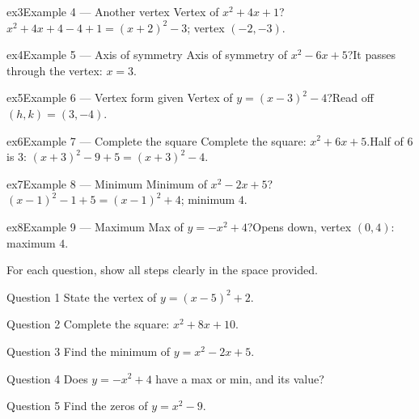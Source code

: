 \documentclass[11pt]{article}
\begin{document}
\begin{example}{ex3}{Example 4 --- Another vertex}
Vertex of $x^2+4x+1$?\soln $x^2+4x+4-4+1=(x+2)^2-3$; vertex $(-2,-3)$.
\end{example}

\begin{example}{ex4}{Example 5 --- Axis of symmetry}
Axis of symmetry of $x^2-6x+5$?\soln It passes through the vertex: $x=3$.
\end{example}

\begin{example}{ex5}{Example 6 --- Vertex form given}
Vertex of $y=(x-3)^2-4$?\soln Read off $(h,k)=(3,-4)$.
\end{example}

\begin{example}{ex6}{Example 7 --- Complete the square}
Complete the square: $x^2+6x+5$.\soln Half of $6$ is $3$: $(x+3)^2-9+5=(x+3)^2-4$.
\end{example}

\begin{example}{ex7}{Example 8 --- Minimum}
Minimum of $x^2-2x+5$?\soln $(x-1)^2-1+5=(x-1)^2+4$; minimum $4$.
\end{example}

\begin{example}{ex8}{Example 9 --- Maximum}
Max of $y=-x^2+4$?\soln Opens down, vertex $(0,4)$: maximum $4$.
\end{example}

\clearpage
{}
For each question, show all steps clearly in the space provided.

\begin{qbox}{Question 1}
State the vertex of $y=(x-5)^2+2$.\workspace{2.4cm}
\end{qbox}

\begin{qbox}{Question 2}
Complete the square: $x^2+8x+10$.\workspace{2.4cm}
\end{qbox}

\begin{qbox}{Question 3}
Find the minimum of $y=x^2-2x+5$.\workspace{2.4cm}
\end{qbox}

\begin{qbox}{Question 4}
Does $y=-x^2+4$ have a max or min, and its value?\workspace{2.4cm}
\end{qbox}

\begin{qbox}{Question 5}
Find the zeros of $y=x^2-9$.\workspace{2.4cm}
\end{qbox}
\end{document}
